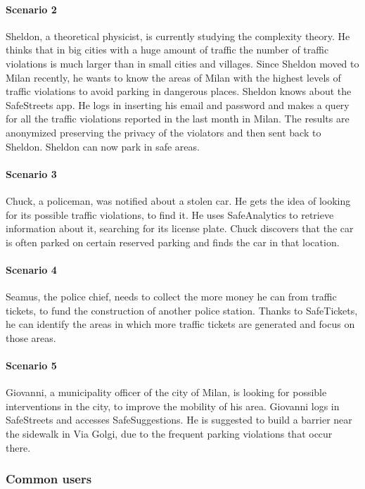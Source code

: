 \documentclass[a4paper]{article}
\begin{document}
\paragraph{Scenario 2}
Sheldon, a theoretical physicist, is currently studying the complexity
theory. He thinks that in big cities with a huge amount of traffic the
number of traffic violations is much larger than in small cities and
villages. Since Sheldon moved to Milan recently, he wants to know the
areas of Milan with the highest levels of traffic violations to avoid
parking in dangerous places. Sheldon knows about the SafeStreets app. He
logs in inserting his email and password and makes a query for all the
traffic violations reported in the last month in Milan. The results are
anonymized preserving the privacy of the violators and then sent back to
Sheldon. Sheldon can now park in safe areas.

\paragraph{Scenario 3}
Chuck, a policeman, was notified about a stolen car. He gets the idea of
looking for its possible traffic violations, to find it. He uses
SafeAnalytics to retrieve information about it, searching for its
license plate. Chuck discovers that the car is often parked on certain
reserved parking and finds the car in that location.

\paragraph{Scenario 4}
Seamus, the police chief, needs to collect the more money he can from
traffic tickets, to fund the construction of another police station.
Thanks to SafeTickets, he can identify the areas in which more traffic
tickets are generated and focus on those areas.

\paragraph{Scenario 5}
Giovanni, a municipality officer of the city of Milan, is looking for
possible interventions in the city, to improve the mobility of his area.
Giovanni logs in SafeStreets and accesses SafeSuggestions. He is
suggested to build a barrier near the sidewalk in Via Golgi, due to the
frequent parking violations that occur there.

\subsubsection{Common users}
\end{document}
